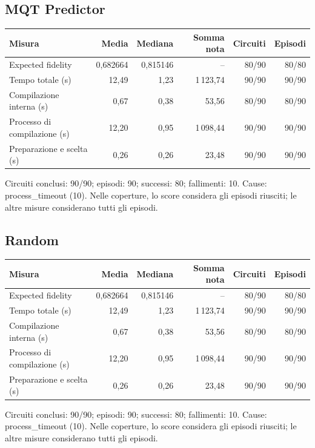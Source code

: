\subsection{MQT Predictor}
\begingroup\footnotesize
\setlength{\tabcolsep}{5pt}
\begin{center}
\begin{tabular}{lrrrrr}
\toprule
Misura & Media & Mediana & Somma nota & Circuiti & Episodi \\
\midrule
Expected fidelity & 0,682664 & 0,815146 & -- & 80/90 & 80/80 \\
Tempo totale (s) & 12,49 & 1,23 & 1\,123,74 & 90/90 & 90/90 \\
Compilazione interna (s) & 0,67 & 0,38 & 53,56 & 80/90 & 80/90 \\
Processo di compilazione (s) & 12,20 & 0,95 & 1\,098,44 & 90/90 & 90/90 \\
Preparazione e scelta (s) & 0,26 & 0,26 & 23,48 & 90/90 & 90/90 \\
\bottomrule
\end{tabular}
\end{center}
\endgroup
Circuiti conclusi: 90/90; episodi: 90; successi: 80; fallimenti: 10. Cause: process\_timeout (10). Nelle coperture, lo score considera gli episodi riusciti; le altre misure considerano tutti gli episodi.

\subsection{Random}
\begingroup\footnotesize
\setlength{\tabcolsep}{5pt}
\begin{center}
\begin{tabular}{lrrrrr}
\toprule
Misura & Media & Mediana & Somma nota & Circuiti & Episodi \\
\midrule
Expected fidelity & 0,682664 & 0,815146 & -- & 80/90 & 80/80 \\
Tempo totale (s) & 12,49 & 1,23 & 1\,123,74 & 90/90 & 90/90 \\
Compilazione interna (s) & 0,67 & 0,38 & 53,56 & 80/90 & 80/90 \\
Processo di compilazione (s) & 12,20 & 0,95 & 1\,098,44 & 90/90 & 90/90 \\
Preparazione e scelta (s) & 0,26 & 0,26 & 23,48 & 90/90 & 90/90 \\
\bottomrule
\end{tabular}
\end{center}
\endgroup
Circuiti conclusi: 90/90; episodi: 90; successi: 80; fallimenti: 10. Cause: process\_timeout (10). Nelle coperture, lo score considera gli episodi riusciti; le altre misure considerano tutti gli episodi.

